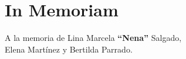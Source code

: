 \section*{In Memoriam}
\begin{flushright}
{\large A la memoria de Lina Marcela {\bf ``Nena''} Salgado,\\
Elena Martínez y Bertilda Parrado.}
\end{flushright}
